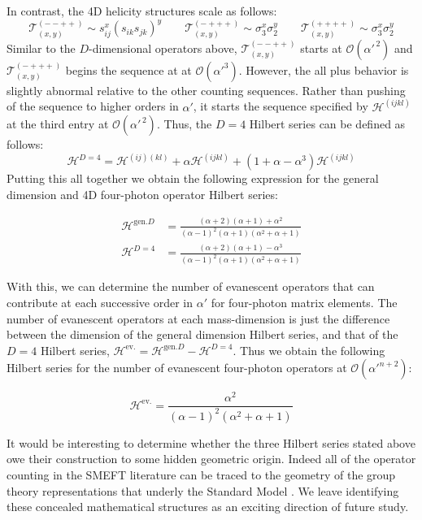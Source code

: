 \documentclass[11pt,letter]{article}
\begin{document}
In contrast, the 4D helicity structures scale as follows:
\begin{equation}
\mathcal{T}^{(--++)}_{(x,y)} \sim s_{ij}^x(s_{ik}s_{jk})^y \qquad \mathcal{T}^{(-+++)}_{(x,y)} \sim \sigma_3^x\sigma_2^y\qquad \mathcal{T}^{(++++)}_{(x,y)} \sim \sigma_3^x\sigma_2^y
\end{equation}
Similar to the $D$-dimensional operators above, $\mathcal{T}^{(--++)}_{(x,y)}$ starts at $\mathcal{O}(\alpha'^{\,2})$ and $\mathcal{T}^{(-+++)}_{(x,y)}$ begins the sequence at at $\mathcal{O}(\alpha'^3)$. However, the all plus behavior is slightly abnormal relative to the other counting sequences. Rather than pushing of the sequence to higher orders in $\alpha'$, it starts the sequence specified by $\mathcal{H}^{(ijkl)}$ at the {third entry} at $\mathcal{O}(\alpha'^{\,2})$. Thus, the $D=4$ Hilbert series can be defined as follows:
\begin{equation}
\mathcal{H}^{D=4} = \mathcal{H}^{(ij)(kl)} + \alpha \mathcal{H}^{(ijkl)} + (1+\alpha-\alpha^3)\mathcal{H}^{(ijkl)}
\end{equation}
Putting this all together we obtain the following expression for the general dimension and 4D four-photon operator Hilbert series:
\begin{eBox}
\begin{equation}
\begin{aligned}
\mathcal{H}^{\text{gen.}D} &= \frac{(\alpha+2)(\alpha+1)+\alpha^2}{(\alpha
-1)^2(\alpha+1)(\alpha^2+\alpha+1)}
\\
\mathcal{H}^{D=4} &= \frac{(\alpha+2)(\alpha+1)-\alpha^3}{(\alpha-1)^2(\alpha+1)(\alpha^2+\alpha+1)}
\end{aligned}
\end{equation}
\end{eBox}
With this, we can determine the number of evanescent operators that can contribute at each successive order in $\alpha'$ for four-photon matrix elements. The number of evanescent operators at each mass-dimension is just the difference between the dimension of the general dimension Hilbert series, and that of the $D=4$ Hilbert series, $\mathcal{H}^{\text{ev.}}=\mathcal{H}^{\text{gen.}D} - \mathcal{H}^{D=4}$. Thus we obtain the following Hilbert series for the number of evanescent four-photon operators at $\mathcal{O}(\alpha'^{n+2})$:
\begin{eBox}
\begin{equation}
\mathcal{H}^{\text{ev.}} = \frac{\alpha^2}{(\alpha-1)^2(\alpha^2+\alpha+1)}
\end{equation}
\end{eBox}
It would be interesting to determine whether the three Hilbert series stated above owe their construction to some hidden geometric origin. Indeed all of the operator counting in the SMEFT literature can be traced to the geometry of the group theory representations that underly the Standard Model \cite{Henning:2015daa,Lehman:2015via}. We leave identifying these concealed mathematical structures as an exciting direction of future study. 
\end{document}
